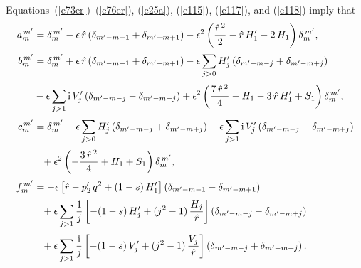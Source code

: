 \documentclass[12pt,prb,aps]{revtex4-1}
\begin{document}
Equations~(\ref{e73er})--(\ref{e76er}), (\ref{e25a}), (\ref{e115}), (\ref{e117}), and (\ref{e118}) imply that
\begin{align}\label{e120}
a_m^{\,m'} &= \delta_{m}^{\,m'} -\epsilon\,\hat{r}\left(\delta_{m'-m-1}+\delta_{m'-m+1}\right)-\epsilon^2\left(\frac{\hat{r}^{\,2}}{2}-\hat{r}\,H_1'-2\,H_1\right)\delta_m^{\,m'},\\[0.5ex]
b_m^{\,m'}&= \delta_m^{\,m'}+\epsilon\,\hat{r}\left(\delta_{m'-m-1}+\delta_{m'-m+1}\right)-\epsilon\sum_{j>0}H_j'\left(\delta_{m'-m-j}+\delta_{m'-m+j}\right)\nonumber\\[0.5ex]
&- \epsilon\sum_{j>1}{\rm i}\,V_j'\left(\delta_{m'-m-j} - \delta_{m'-m+j}\right)+ \epsilon^2\left(\frac{7\,\hat{r}^{\,2}}{4} - H_1 -3\,\hat{r}\,H_1' + S_1\right)\delta_{m}^{\,m'},\\[0.5ex]
c_m^{\,m'} &= \delta_m^{\,m'}-\epsilon\sum_{j>0}H_j'\left(\delta_{m'-m-j}+\delta_{m'-m+j}\right)- \epsilon\sum_{j>1}{\rm i}\,V_j'\left(\delta_{m'-m-j} - \delta_{m'-m+j}\right)\nonumber\\[0.5ex]
&\phantom{=}+ \epsilon^2\left(-\frac{3\,\hat{r}^{\,2}}{4} + H_1 + S_1\right)\delta_{m}^{\,m'},\\[0.5ex]
f_m^{\,m'} &= -\epsilon\left[\hat{r} - p_2'\,q^2+ (1-s)\,H_1'\right]\left(\delta_{m'-m-1}-\delta_{m'-m+1}\right) \nonumber\\[0.5ex]
&\phantom{=}+ \epsilon\sum_{j>1}\frac{1}{j}\left[-(1-s)\,H_j'+(j^2-1)\,\frac{H_j}{\hat{r}}\right]\left(\delta_{m'-m-j}-\delta_{m'-m+j}\right)\nonumber\\[0.5ex]
&\phantom{=}+ \epsilon\sum_{j>1}\frac{{\rm i}}{j}\left[-(1-s)\,V_j'+(j^2-1)\,\frac{V_j}{\hat{r}}\right]
\left(\delta_{m'-m-j}+\delta_{m'-m+j}\right).\label{e123}
\end{align}
\end{document}
